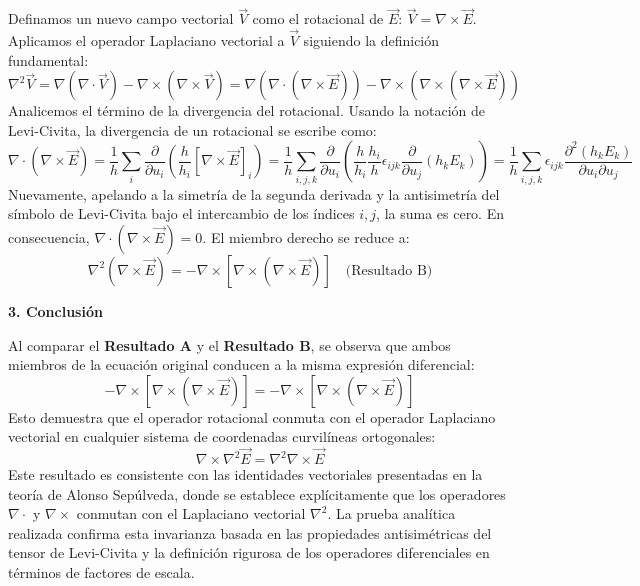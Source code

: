 \documentclass[a4paper]{article}
\begin{document}
Definamos un nuevo campo vectorial $\vec{V}$ como el rotacional de $\vec{E}$: $\vec{V} = \nabla \times \vec{E}$. Aplicamos el operador Laplaciano vectorial a $\vec{V}$ siguiendo la definición fundamental:
\begin{equation}
\nabla^2 \vec{V} = \nabla(\nabla \cdot \vec{V}) - \nabla \times (\nabla \times \vec{V}) = \nabla(\nabla \cdot (\nabla \times \vec{E})) - \nabla \times (\nabla \times (\nabla \times \vec{E}))
\end{equation}
Analicemos el término de la divergencia del rotacional. Usando la notación de Levi-Civita, la divergencia de un rotacional se escribe como:
\begin{equation}
\nabla \cdot (\nabla \times \vec{E}) = \frac{1}{h} \sum_i \frac{\partial}{\partial u_i} \left( \frac{h}{h_i} [\nabla \times \vec{E}]_i \right) = \frac{1}{h} \sum_{i,j,k} \frac{\partial}{\partial u_i} \left( \frac{h}{h_i} \frac{h_i}{h} \epsilon_{ijk} \frac{\partial}{\partial u_j} (h_k E_k) \right) = \frac{1}{h} \sum_{i,j,k} \epsilon_{ijk} \frac{\partial^2 (h_k E_k)}{\partial u_i \partial u_j}
\end{equation}
Nuevamente, apelando a la simetría de la segunda derivada y la antisimetría del símbolo de Levi-Civita bajo el intercambio de los índices $i, j$, la suma es cero. En consecuencia, $\nabla \cdot (\nabla \times \vec{E}) = 0$. El miembro derecho se reduce a:
\begin{equation}
\nabla^2 (\nabla \times \vec{E}) = - \nabla \times \left[ \nabla \times (\nabla \times \vec{E}) \right] \quad \text{(Resultado B)}
\end{equation}

\textbf{3. Conclusión}

Al comparar el \textbf{Resultado A} y el \textbf{Resultado B}, se observa que ambos miembros de la ecuación original conducen a la misma expresión diferencial:
\begin{equation}
- \nabla \times \left[ \nabla \times (\nabla \times \vec{E}) \right] = - \nabla \times \left[ \nabla \times (\nabla \times \vec{E}) \right]
\end{equation}
Esto demuestra que el operador rotacional conmuta con el operador Laplaciano vectorial en cualquier sistema de coordenadas curvilíneas ortogonales:
\begin{equation}
\nabla \times \nabla^2 \vec{E} = \nabla^2 \nabla \times \vec{E}
\end{equation}
Este resultado es consistente con las identidades vectoriales presentadas en la teoría de Alonso Sepúlveda, donde se establece explícitamente que los operadores $\nabla \cdot$ y $\nabla \times$ conmutan con el Laplaciano vectorial $\nabla^2$. La prueba analítica realizada confirma esta invarianza basada en las propiedades antisimétricas del tensor de Levi-Civita y la definición rigurosa de los operadores diferenciales en términos de factores de escala.
\end{document}
